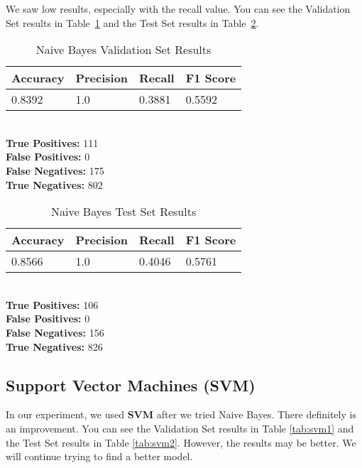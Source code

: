 \documentclass[conference]{IEEEtran}
\begin{document}
We saw low results, especially with the recall value. You can see the Validation Set results in Table \ref{tab:nb1} and the Test Set results in Table \ref{tab:nb2}.

\begin{table}[H]
    \caption{Naive Bayes Validation Set Results}

    \begin{tabularx}{\linewidth}{|X|X|X|X|}
        \hline
        \textbf{Accuracy} & \textbf{Precision} & \textbf{Recall} & \textbf{F1 Score} \\
        \hline
        0.8392 & 1.0 & 0.3881 & 0.5592 \\
        \hline
    \end{tabularx}\\

    \textbf{True Positives:} 111\\
    \textbf{False Positives:} 0\\
    \textbf{False Negatives:} 175\\
    \textbf{True Negatives:} 802
    \label{tab:nb1}
\end{table}

\begin{table}[H]
    \caption{Naive Bayes Test Set Results}

    \begin{tabularx}{\linewidth}{|X|X|X|X|}
        \hline
        \textbf{Accuracy} & \textbf{Precision} & \textbf{Recall} & \textbf{F1 Score} \\
        \hline
        0.8566 & 1.0 & 0.4046 & 0.5761 \\
        \hline
    \end{tabularx}\\

    \textbf{True Positives:} 106\\
    \textbf{False Positives:} 0\\
    \textbf{False Negatives:} 156\\
    \textbf{True Negatives:} 826
    \label{tab:nb2}
\end{table}

\subsection{Support Vector Machines (SVM)} 

In our experiment, we used \textbf{SVM} after we tried Naive Bayes. There definitely is an improvement. You can see the Validation Set results in Table \ref{tab:svm1} and the Test Set results in Table \ref{tab:svm2}. However, the results may be better. We will continue trying to find a better model.
\end{document}

